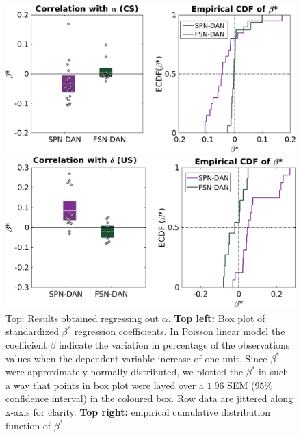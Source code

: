 \begin{figure}[H]
    \centering
    \includegraphics[scale=0.42]{figures/alphaRegrNew3.png}
    
    \vspace{1cm}
    \includegraphics[scale=0.42]{figures/deltaRegr3.png}
    \caption{Top: Results obtained regressing out $\alpha$. \textbf{Top left:} Box plot of standardized $\beta^*$ regression coefficients. In Poisson linear model the coefficient $\beta$ indicate the variation in percentage of the observations values when the dependent variable increase of one unit. Since $\beta^*$ were approximately normally distributed, we plotted the $\beta^*$ in such a way that points in box plot were layed over a $1.96$ SEM ($95\%$ confidence interval) in the coloured box. Row data are jittered along x-axis for clarity. \textbf{Top right:} empirical cumulative distribution function of $\beta^*$}
    \label{fig:AlphaDeltaReg}
\end{figure}
